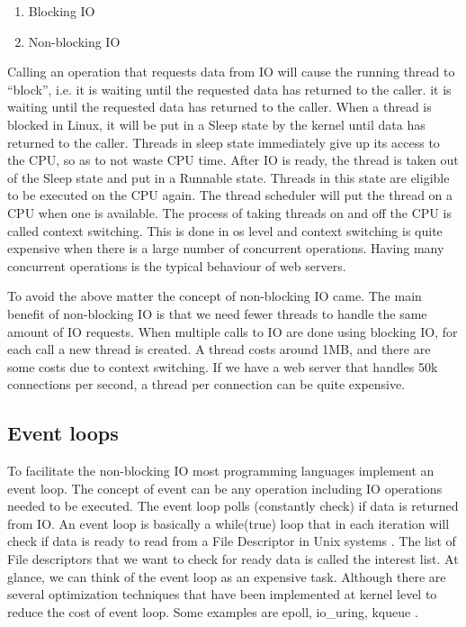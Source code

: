 \begin{enumerate}
	\item Blocking IO
	\item Non-blocking IO
	
\end{enumerate}

Calling an operation that requests data from IO will cause the running thread to “block”, i.e. it is
waiting until the requested data has returned to the caller. it is waiting until the requested data has
returned to the caller. When a thread is blocked in Linux, it will be put in a Sleep state by the kernel
until data has returned to the caller. Threads in sleep state immediately give up its access to the CPU,
so as to not waste CPU time. After IO is ready, the thread is taken out of the Sleep state and put in a
Runnable state. Threads in this state are eligible to be executed on the CPU again. The thread
scheduler will put the thread on a CPU when one is available. The process of taking threads on and off
the CPU is called context switching. This is done in os level and context switching is quite expensive
when there is a large number of concurrent operations. Having many concurrent
operations is the typical behaviour of web servers.

To avoid the above matter the concept of non-blocking IO came. The main benefit of non-blocking IO
is that we need fewer threads to handle the same amount of IO requests. When multiple calls to IO are
done using blocking IO, for each call a new thread is created. A thread costs around 1MB, and there
are some costs due to context switching. If we have a web server that handles 50k connections per
second, a thread per connection can be quite expensive.

\subsection{Event loops}
To facilitate the non-blocking IO most programming languages implement an event loop. The concept
of event can be any operation including IO operations needed to be executed. The event loop polls
(constantly check) if data is returned from IO. An event loop is basically a while(true) loop that in
each iteration will check if data is ready to read from a File Descriptor in Unix systems \cite{device_file}. The
list of File descriptors that we want to check for ready data is called the interest list. At glance, we can
think of the event loop as an expensive task. Although there are several optimization techniques that
have been implemented at kernel level to reduce the cost of event loop. Some examples are epoll,
io{\_}uring, kqueue \cite{web_pipeline,io_uring}.


